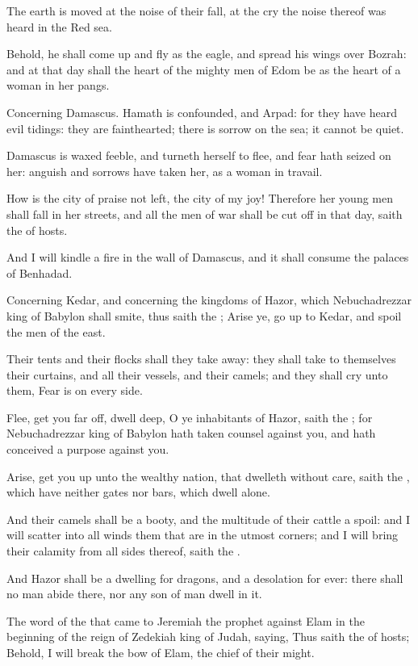 \verse The earth is moved at the noise of their fall, at the cry the noise thereof was heard in the Red sea.

\verse Behold, he shall come up and fly as the eagle, and spread his wings over Bozrah: and at that day shall the heart of the mighty men of Edom be as the heart of a woman in her pangs.

\verse Concerning Damascus. Hamath is confounded, and Arpad: for they have heard evil tidings: they are fainthearted; there is sorrow on the sea; it cannot be quiet.

\verse Damascus is waxed feeble, and turneth herself to flee, and fear hath seized on her: anguish and sorrows have taken her, as a woman in travail.

\verse How is the city of praise not left, the city of my joy!  \verse Therefore her young men shall fall in her streets, and all the men of war shall be cut off in that day, saith the \LORD of hosts.

\verse And I will kindle a fire in the wall of Damascus, and it shall consume the palaces of Benhadad.

\verse Concerning Kedar, and concerning the kingdoms of Hazor, which Nebuchadrezzar king of Babylon shall smite, thus saith the \LORD; Arise ye, go up to Kedar, and spoil the men of the east.

\verse Their tents and their flocks shall they take away: they shall take to themselves their curtains, and all their vessels, and their camels; and they shall cry unto them, Fear is on every side.

\verse Flee, get you far off, dwell deep, O ye inhabitants of Hazor, saith the \LORD; for Nebuchadrezzar king of Babylon hath taken counsel against you, and hath conceived a purpose against you.

\verse Arise, get you up unto the wealthy nation, that dwelleth without care, saith the \LORD, which have neither gates nor bars, which dwell alone.

\verse And their camels shall be a booty, and the multitude of their cattle a spoil: and I will scatter into all winds them that are in the utmost corners; and I will bring their calamity from all sides thereof, saith the \LORD.

\verse And Hazor shall be a dwelling for dragons, and a desolation for ever: there shall no man abide there, nor any son of man dwell in it.

\verse The word of the \LORD that came to Jeremiah the prophet against Elam in the beginning of the reign of Zedekiah king of Judah, saying, \verse Thus saith the \LORD of hosts; Behold, I will break the bow of Elam, the chief of their might.


